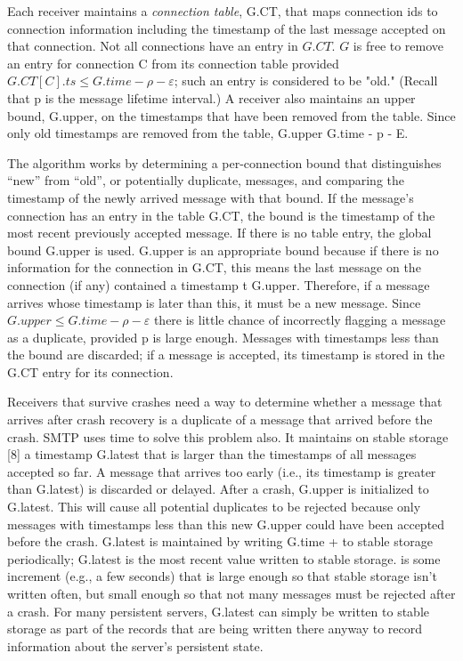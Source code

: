 \documentclass[a4paper,11pt,notitlepage,twoside,openright]{article}
\begin{document}
Each receiver maintains a \emph{connection table}, G.CT, that maps
connection ids to connection information including the timestamp of the
last message accepted on that connection. Not all connections have an
entry in $G.CT$. $G$ is free to remove an entry for connection C from its
connection table provided $G.CT[C].ts \leq G.time - \rho - \varepsilon$; such an entry is
considered to be "old." (Recall that p is the message lifetime
interval.) A receiver also maintains an upper bound, G.upper, on the
timestamps that have been removed from the table. Since only old
timestamps are removed from the table, G.upper G.time - p - E.

The algorithm works by determining a per-connection bound that
distinguishes ``new'' from ``old'', or potentially duplicate, messages, and
comparing the timestamp of the newly arrived message with that bound. If
the message's connection has an entry in the table G.CT, the bound is
the timestamp of the most recent previously accepted message. If there
is no table entry, the global bound G.upper is used. G.upper is an
appropriate bound because if there is no information for the connection
in G.CT, this means the last message on the connection (if any)
contained a timestamp t G.upper. Therefore, if a message arrives whose
timestamp is later than this, it must be a new message. Since $G.upper \leq
G.time - \rho - \varepsilon$ there is little chance
of incorrectly flagging a message as a duplicate, provided p is large
enough. Messages with timestamps less than the bound are discarded; if a
message is accepted, its timestamp is stored in the G.CT entry for its
connection.

Receivers that survive crashes need a way to determine whether a message
that arrives after crash recovery is a duplicate of a message that
arrived before the crash. SMTP uses time to solve this problem also. It
maintains on stable storage {[}8{]} a timestamp G.latest that is larger
than the timestamps of all messages accepted so far. A message that
arrives too early (i.e., its timestamp is greater than G.latest) is
discarded or delayed. After a crash, G.upper is initialized to G.latest.
This will cause all potential duplicates to be rejected because only
messages with timestamps less than this new G.upper could have been
accepted before the crash. G.latest is maintained by writing G.time + to
stable storage periodically; G.latest is the most recent value written
to stable storage. is some increment (e.g., a few seconds) that is large
enough so that stable storage isn't written often, but small enough so
that not many messages must be rejected after a crash. For many
persistent servers, G.latest can simply be written to stable storage as
part of the records that are being written there anyway to record
information about the server's persistent state.
\end{document}
